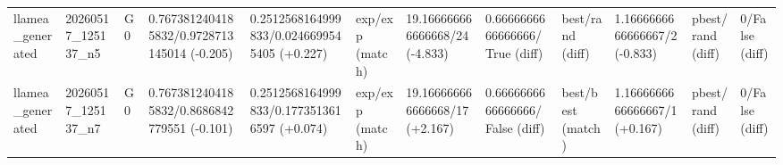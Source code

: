 \begin{table}[htbp]
\begin{tabular}{llllllllllll}
llamea\_generated & 20260517\_125137\_n5 & G0 & 0.7673812404185832/0.9728713145014 (-0.205) & 0.2512568164999833/0.0246699545405 (+0.227) & exp/exp (match) & 19.166666666666668/24 (-4.833) & 0.6666666666666666/True (diff) & best/rand (diff) & 1.1666666666666667/2 (-0.833) & pbest/rand (diff) & 0/False (diff) \\
llamea\_generated & 20260517\_125137\_n7 & G0 & 0.7673812404185832/0.8686842779551 (-0.101) & 0.2512568164999833/0.1773513616597 (+0.074) & exp/exp (match) & 19.166666666666668/17 (+2.167) & 0.6666666666666666/False (diff) & best/best (match) & 1.1666666666666667/1 (+0.167) & pbest/rand (diff) & 0/False (diff) \\
\bottomrule
\end{tabular}
\end{table}